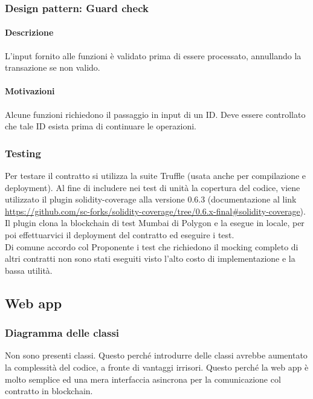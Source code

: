 \documentclass[a4paper, 12pt]{article}
\begin{document}
\subsubsection{Design pattern: Guard check}
\paragraph{Descrizione}
L'input fornito alle funzioni è validato prima di essere processato, annullando la transazione se non valido.
\paragraph{Motivazioni}
Alcune funzioni richiedono il passaggio in input di un ID.
Deve essere controllato che tale ID esista prima di continuare le operazioni.

\subsubsection{Testing}
Per testare il contratto si utilizza la suite Truffle (usata anche per compilazione e deployment).
Al fine di includere nei test di unità la copertura del codice, viene utilizzato il plugin solidity-coverage alla versione 0.6.3 (documentazione al link \href{https://github.com/sc-forks/solidity-coverage/tree/0.6.x-final#solidity-coverage}{https://github.com/sc-forks/solidity-coverage/tree/0.6.x-final\#solidity-coverage}).\\
Il plugin clona la blockchain di test Mumbai di Polygon e la esegue in locale, per poi effettuarvici il deployment del contratto ed eseguire i test.\\
Di comune accordo col Proponente i test che richiedono il mocking completo di altri contratti non sono stati eseguiti visto l'alto costo di implementazione e la bassa utilità.

\newpage
\subsection{Web app}
\subsubsection{Diagramma delle classi}
Non sono presenti classi. Questo perché introdurre delle classi avrebbe aumentato la complessità del codice, a fronte di vantaggi irrisori. Questo perché la web app è molto semplice ed una mera interfaccia asincrona per la comunicazione col contratto in blockchain.
\end{document}
